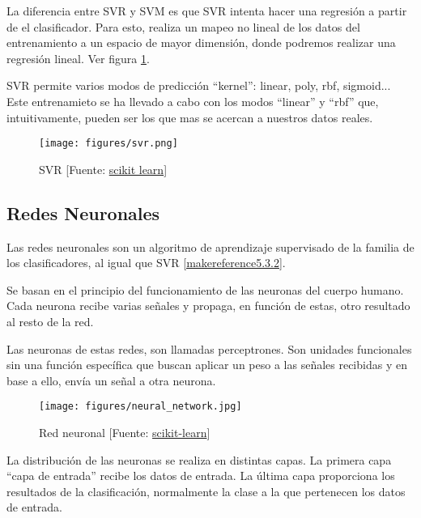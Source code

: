 	La diferencia entre SVR y SVM es que SVR intenta hacer una regresión a partir de el clasificador. Para esto, realiza un mapeo no lineal de los datos del entrenamiento a un espacio de mayor dimensión, donde podremos realizar una regresión lineal. Ver figura \ref{svr}.

	SVR permite varios modos de predicción ``kernel'': linear, poly, rbf, sigmoid...
	Este entrenamieto se ha llevado a cabo con los modos ``linear'' y ``rbf'' que, intuitivamente, pueden ser los que mas se acercan a nuestros datos reales.

	\begin{figure}[htb]
		\begin{center}
			\texttt{[image: figures/svr.png]}
			\caption{SVR [Fuente: \href{http://scikit-learn.org/stable/auto_examples/svm/plot_svm_regression.html}{scikit learn}] \label{svr}}
		\end{center}
	\end{figure}
	
	\subsection{Redes Neuronales}
	\label{makereference5.3.3}
	Las redes neuronales son un algoritmo de aprendizaje supervisado de la familia de los clasificadores, al igual que SVR \ref{makereference5.3.2}.

	Se basan en el principio del funcionamiento de las neuronas del cuerpo humano. Cada neurona recibe varias señales y propaga, en función de estas, otro resultado al resto de la red.

	Las neuronas de estas redes, son llamadas perceptrones. Son unidades funcionales sin una función específica que buscan aplicar un peso a las señales recibidas y en base a ello, envía un señal a otra neurona.

	\begin{figure}[htb]
		\begin{center}
			\texttt{[image: figures/neural\_network.jpg]}
			\caption{Red neuronal [Fuente: \href{www.scikit-learn.org}{scikit-learn}] \label{network}}
		\end{center}
	\end{figure}

	La distribución de las neuronas se realiza en distintas capas. La primera capa ``capa de entrada'' recibe los datos de entrada. La última capa proporciona los resultados de la clasificación, normalmente la clase a la que pertenecen los datos de entrada.


